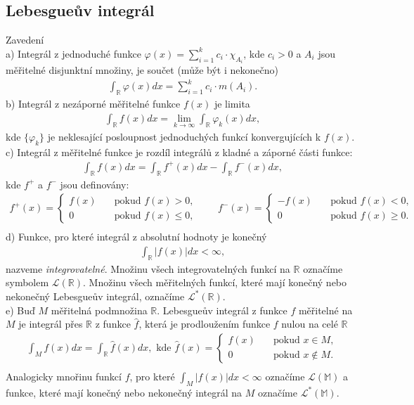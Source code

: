 \subsection{Lebesgueův integrál}
\begin{definition}Zavedení\\
a) Integrál z jednoduché funkce $\varphi(x)=\sum_{i=1}^k c_i\cdot  \chi_{A_i}$, kde $c_i>0$ a $A_i$ jsou měřitelné disjunktní množiny, je součet (může být i nekonečno)
\begin{align*}
\int_\mathbb{R}\varphi(x)dx=\sum_{i=1}^k c_i \cdot m(A_i).
\end{align*}
b) Integrál z nezáporné měřitelné funkce $f(x)$ je limita
\begin{align*}
\int_\mathbb{R}f(x)dx=\lim_{k\rightarrow\infty}\int_\mathbb{R}\varphi_k(x)dx,
\end{align*}
kde $\{\varphi_k\}$ je neklesající posloupnost jednoduchých funkcí konvergujících k $f(x)$.\\
c) Integrál z měřitelné funkce je rozdíl integrálů z kladné a záporné části funkce:
\begin{align*}
\int_\mathbb{R} f(x)dx=\int_\mathbb{R} f^+(x)dx-\int_\mathbb{R}f^-(x)dx,
\end{align*}
kde $f^+$ a $f^-$ jsou definovány:
\begin{align*}
f^+(x)=\begin{cases}
f(x)\quad &\text{pokud } f(x)>0,\\0 \quad &\text{pokud } f(x)\leq 0,
\end{cases}\qquad
f^-(x)=\begin{cases}
-f(x)\quad &\text{pokud } f(x)<0,\\0 \quad &\text{pokud } f(x)\geq 0.
\end{cases}\\
\end{align*}
d) Funkce, pro které integrál z absolutní hodnoty je konečný
\begin{align*}
\int_\mathbb{R}|f(x)|dx<\infty,
\end{align*}
nazveme \textit{integrovatelné}. Množinu všech integrovatelných funkcí na $\mathbb{R}$ označíme symbolem $\mathscr{L}(\mathbb{R})$. Množinu všech měřitelných funkcí, které mají konečný nebo nekonečný Lebesgueův integrál, označíme $\mathscr{L}^*(\mathbb{R})$.\\
e) Buď $M$ měřitelná podmnožina $\mathbb{R}$. Lebesgueův integrál z funkce $f$ měřitelné na $M$ je integrál přes $\mathbb{R}$ z funkce $\hat{f}$, která je prodloužením funkce $f$ nulou na celé $\mathbb{R}$
\begin{align*}
\int_M f(x) dx=\int_\mathbb{R}\hat{f}(x)dx,\text{ kde } \hat{f}(x)=\begin{cases}
f(x)\quad &\text{pokud } x\in M,\\0 \quad &\text{pokud } x\notin M.
\end{cases}\\
\end{align*}
Analogicky mnořinu funkcí $f$, pro které $\int_M |f(x)|dx<\infty$ označíme $\mathscr{L}(\mathbb{M})$ a funkce, které mají konečný nebo nekonečný integrál na $M$ označíme $\mathscr{L}^*(\mathbb{M})$.
\end{definition}
